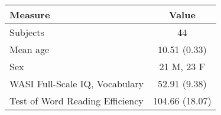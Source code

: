 \begin{tabular}{lc}
\toprule
Measure &               Value \\
\midrule
Subjects                        &              44 \\
Mean age                        &    10.51 (0.33) \\
Sex                             &      21 M, 23 F \\
WASI Full-Scale IQ, Vocabulary  &    52.91 (9.38) \\
Test of Word Reading Efficiency &  104.66 (18.07) \\
\bottomrule
\end{tabular}